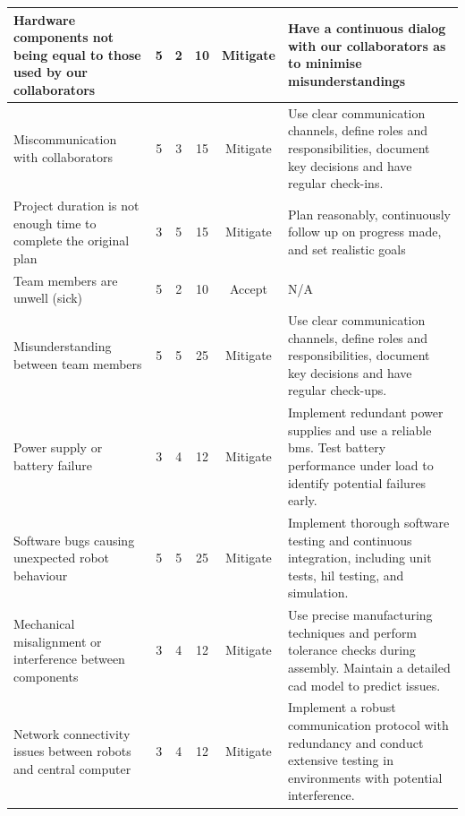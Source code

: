 \begin{longtable}{|p{}|c|c|c|c|p{}|}
    Hardware components not being equal to those used by our collaborators                                                  & 5 & 2 & 10 & Mitigate & Have a continuous dialog with our collaborators as to minimise misunderstandings \\ \hline
    Miscommunication with collaborators                                                                                     & 5 & 3 & 15 & Mitigate & Use clear communication channels, define roles and responsibilities, document key decisions and have regular check-ins. \\ \hline
    Project duration is not enough time to complete the original plan                                                       & 3 & 5 & 15 & Mitigate & Plan reasonably, continuously follow up on progress made, and set realistic goals \\ \hline
    Team members are unwell (sick)                                                                                          & 5 & 2 & 10 & Accept   & N/A \\ \hline
    Misunderstanding between team members                                                                                   & 5 & 5 & 25 & Mitigate & Use clear communication channels, define roles and responsibilities, document key decisions and have regular check-ups. \\ \hline
    Power supply or battery failure                                                                                         & 3 & 4 & 12 & Mitigate & Implement redundant power supplies and use a reliable \ac{bms}. Test battery performance under load to identify potential failures early. \\ \hline
    Software bugs causing unexpected robot behaviour                                                                        & 5 & 5 & 25 & Mitigate & Implement thorough software testing and continuous integration, including unit tests, \ac{hil} testing, and simulation. \\ \hline
    Mechanical misalignment or interference between components                                                              & 3 & 4 & 12 & Mitigate & Use precise manufacturing techniques and perform tolerance checks during assembly. Maintain a detailed \acs{cad} model to predict issues. \\ \hline
    Network connectivity issues between robots and central computer                                                         & 3 & 4 & 12 & Mitigate & Implement a robust communication protocol with redundancy and conduct extensive testing in environments with potential interference. \\ \hline

\end{longtable}
